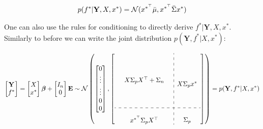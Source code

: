 \begin{gather}\label{def:predictive-dist}
    p(f^{\ast} | \mathbf{Y}, X, x^{\ast}) = \operatorname{\mathcal{N}}(x^{\ast^{\top}} \bar{\mu}, x^{\ast^{\top}} \bar{\Sigma} x^{\ast})
\end{gather}

One can also use the rules for conditioning to directly derive $f^{\ast} | \mathbf{Y}, X, x^{\ast}$.
Similarly to before we can write the joint distribution $p(\mathbf{Y}, f^{\ast}| X, x^{\ast})$:


\begin{gather}
    \begin{bmatrix}
        \mathbf{Y} \\
        f^{\ast}
    \end{bmatrix}
    = \begin{bmatrix} X \\ x^{\ast} \end{bmatrix} \boldsymbol{\beta} + \begin{bmatrix} I_n \\ 0 \end{bmatrix}  \mathbf{E}
    \sim \N \left(
        \begin{bmatrix}
        0 \\
        \vdots \\
        \vdots \\
        0 \\
        0
        \end{bmatrix},
        \left[
        \begin{array}{ c:c c c }
            \begin{matrix}
                & & \\
                & & \\
                & & \\
                & X \Sigma_p X^{\top} + \Sigma_n & \\
                & & \\
                & & \\
                & & \\
            \end{matrix}
            & \begin{matrix} \\ \\ \\ X \Sigma_p x^{\ast} \\ \\ \\ \end{matrix} \\
            \hdashline \\
            \begin{matrix} &  x^{\ast^{\top}}  \Sigma_p X^{\top} & \end{matrix} & \Sigma_p
        \end{array}
        \right]
        \right)
    = p(\mathbf{Y}, f^{\ast}| X, x^{\ast})
\end{gather}

